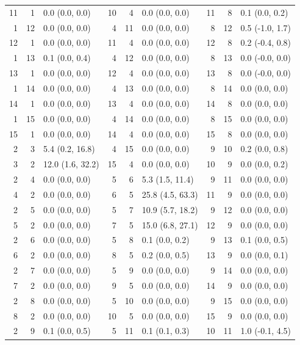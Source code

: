 \begin{table}
\begin{tabular}{|rrl||rrl||rrl|}
 11 & 1 & 0.0 (0.0, 0.0) & 10 & 4 & 0.0 (0.0, 0.0) & 11 & 8 & 0.1 (0.0, 0.2) \\
 1 & 12 & 0.0 (0.0, 0.0) & 4 & 11 & 0.0 (0.0, 0.0) & 8 & 12 & 0.5 (-1.0, 1.7) \\
 12 & 1 & 0.0 (0.0, 0.0) & 11 & 4 & 0.0 (0.0, 0.0) & 12 & 8 & 0.2 (-0.4, 0.8) \\
 1 & 13 & 0.1 (0.0, 0.4) & 4 & 12 & 0.0 (0.0, 0.0) & 8 & 13 & 0.0 (-0.0, 0.0) \\
 13 & 1 & 0.0 (0.0, 0.0) & 12 & 4 & 0.0 (0.0, 0.0) & 13 & 8 & 0.0 (-0.0, 0.0) \\
 1 & 14 & 0.0 (0.0, 0.0) & 4 & 13 & 0.0 (0.0, 0.0) & 8 & 14 & 0.0 (0.0, 0.0) \\
 14 & 1 & 0.0 (0.0, 0.0) & 13 & 4 & 0.0 (0.0, 0.0) & 14 & 8 & 0.0 (0.0, 0.0) \\
 1 & 15 & 0.0 (0.0, 0.0) & 4 & 14 & 0.0 (0.0, 0.0) & 8 & 15 & 0.0 (0.0, 0.0) \\
 15 & 1 & 0.0 (0.0, 0.0) & 14 & 4 & 0.0 (0.0, 0.0) & 15 & 8 & 0.0 (0.0, 0.0) \\
 2 & 3 & 5.4 (0.2, 16.8) & 4 & 15 & 0.0 (0.0, 0.0) & 9 & 10 & 0.2 (0.0, 0.8) \\
 3 & 2 & 12.0 (1.6, 32.2) & 15 & 4 & 0.0 (0.0, 0.0) & 10 & 9 & 0.0 (0.0, 0.2) \\
 2 & 4 & 0.0 (0.0, 0.0) & 5 & 6 & 5.3 (1.5, 11.4) & 9 & 11 & 0.0 (0.0, 0.0) \\
 4 & 2 & 0.0 (0.0, 0.0) & 6 & 5 & 25.8 (4.5, 63.3) & 11 & 9 & 0.0 (0.0, 0.0) \\
 2 & 5 & 0.0 (0.0, 0.0) & 5 & 7 & 10.9 (5.7, 18.2) & 9 & 12 & 0.0 (0.0, 0.0) \\
 5 & 2 & 0.0 (0.0, 0.0) & 7 & 5 & 15.0 (6.8, 27.1) & 12 & 9 & 0.0 (0.0, 0.0) \\
 2 & 6 & 0.0 (0.0, 0.0) & 5 & 8 & 0.1 (0.0, 0.2) & 9 & 13 & 0.1 (0.0, 0.5) \\
 6 & 2 & 0.0 (0.0, 0.0) & 8 & 5 & 0.2 (0.0, 0.5) & 13 & 9 & 0.0 (0.0, 0.1) \\
 2 & 7 & 0.0 (0.0, 0.0) & 5 & 9 & 0.0 (0.0, 0.0) & 9 & 14 & 0.0 (0.0, 0.0) \\
 7 & 2 & 0.0 (0.0, 0.0) & 9 & 5 & 0.0 (0.0, 0.0) & 14 & 9 & 0.0 (0.0, 0.0) \\
 2 & 8 & 0.0 (0.0, 0.0) & 5 & 10 & 0.0 (0.0, 0.0) & 9 & 15 & 0.0 (0.0, 0.0) \\
 8 & 2 & 0.0 (0.0, 0.0) & 10 & 5 & 0.0 (0.0, 0.0) & 15 & 9 & 0.0 (0.0, 0.0) \\
 2 & 9 & 0.1 (0.0, 0.5) & 5 & 11 & 0.1 (0.1, 0.3) & 10 & 11 & 1.0 (-0.1, 4.5) \\

\end{tabular}
\end{table}
